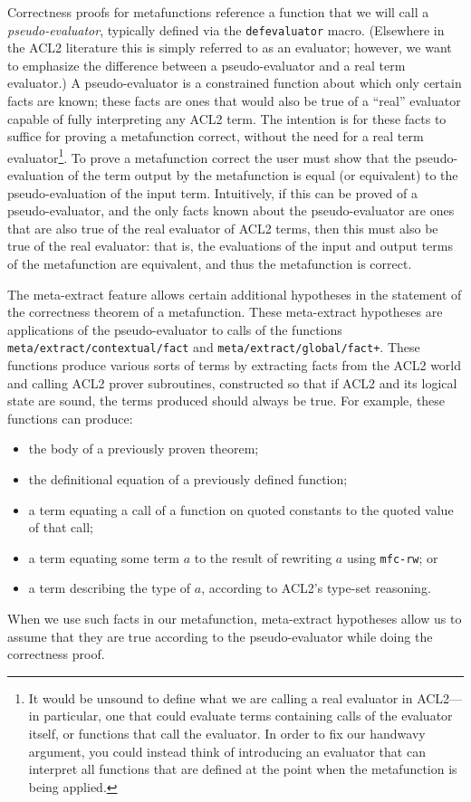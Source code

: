 Correctness proofs for metafunctions reference a
function that we will call a \textit{pseudo-evaluator}, typically
defined via the \texttt{defevaluator} macro.  (Elsewhere in the ACL2
literature this is simply referred to as an evaluator; however, we
want to emphasize the difference between a pseudo-evaluator and a real
term evaluator.)  A pseudo-evaluator is a constrained function about
which only certain facts are known; these facts are ones that would
also be true of a ``real'' evaluator capable of fully interpreting any
ACL2 term.  The intention is for these facts to suffice for
proving a metafunction correct, without the need for
a real term evaluator\footnote{
  It would be unsound to define what we are calling a real evaluator
  in ACL2---in particular, one that could evaluate terms containing
  calls of the evaluator itself, or functions that call the evaluator.
  In order to fix our handwavy argument, you could instead think of
  introducing an evaluator that can interpret all functions that are
  defined at the point when the metafunction is being applied.
}.
To prove a metafunction correct
the user must show that the pseudo-evaluation of the term output by
the metafunction is equal (or equivalent) to the pseudo-evaluation of
the input term.  Intuitively, if this can be proved of a
pseudo-evaluator, and the only facts known about the pseudo-evaluator
are ones that are also true of the real evaluator of ACL2 terms, then
this must also be true of the real evaluator: that is, the evaluations
of the input and output terms of the metafunction are equivalent, and
thus the metafunction is correct.

The meta-extract feature allows certain additional hypotheses in the
statement of the correctness theorem of a metafunction.  These meta-extract
hypotheses are applications of the pseudo-evaluator to calls of the
functions \texttt{meta\-/extract\-/contextual\-/fact} and
   \texttt{meta\-/extract\-/global\-/fact+}.
 These functions produce various
sorts of terms by extracting facts from the ACL2 world and calling
ACL2 prover subroutines, constructed so that if ACL2 and its logical
state are sound, the terms produced should always be true.  For
example, these functions can produce:
\begin{itemize}
\item the body of a previously proven theorem;
\item the definitional equation of a previously defined function;
\item a term equating a call of a function on quoted constants to the
  quoted value of that call;
\item a term equating some term $a$ to the result of rewriting $a$
  using \texttt{mfc-rw}; or
\item a term describing the type of $a$, according to ACL2's type-set
  reasoning.
\end{itemize}
When we use such facts in our metafunction, meta-extract hypotheses
allow us to assume that they are true according to the
pseudo-evaluator while doing the correctness proof.


